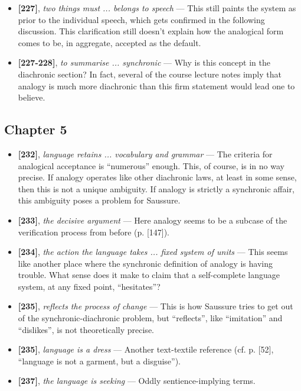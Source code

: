 \documentclass[12pt]{article}
\begin{document}
\begin{itemize}
\item \textbf{[227]}, \textit{two things must ... belongs to speech} --- This still paints the system as prior to the individual speech, which gets confirmed in the following discussion. This clarification still doesn't explain how the analogical form comes to be, in aggregate, accepted as the default.

\item \textbf{[227-228]}, \textit{to summarise ... synchronic} --- Why is this concept in the diachronic section? In fact, several of the course lecture notes imply that analogy is much more diachronic than this firm statement would lead one to believe.

\end{itemize}

\subsection{Chapter 5}

\begin{itemize}

\item \textbf{[232]}, \textit{language retains ... vocabulary and grammar} --- The criteria for analogical acceptance is ``numerous'' enough. This, of course, is in no way precise. If analogy operates like other diachronic laws, at least in some sense, then this is not a unique ambiguity. If analogy is strictly a synchronic affair, this ambiguity poses a problem for Saussure.

\item \textbf{[233]}, \textit{the decisive argument} --- Here analogy seems to be a subcase of the verification process from before (p. [147]).

\item \textbf{[234]}, \textit{the action the language takes ... fixed system of units} --- This seems like another place where the synchronic definition of analogy is having trouble. What sense does it make to claim that a self-complete language system, at any fixed point, ``hesitates''?

\item \textbf{[235]}, \textit{reflects the process of change} --- This is how Saussure tries to get out of the synchronic-diachronic problem, but ``reflects'', like ``imitation'' and ``dislikes'', is not theoretically precise.

\item \textbf{[235]}, \textit{language is a dress} --- Another text-textile reference (cf. p. [52], ``language is not a garment, but a disguise''). 

\item \textbf{[237]}, \textit{the language is seeking} --- Oddly sentience-implying terms.

\end{itemize}
\end{document}
